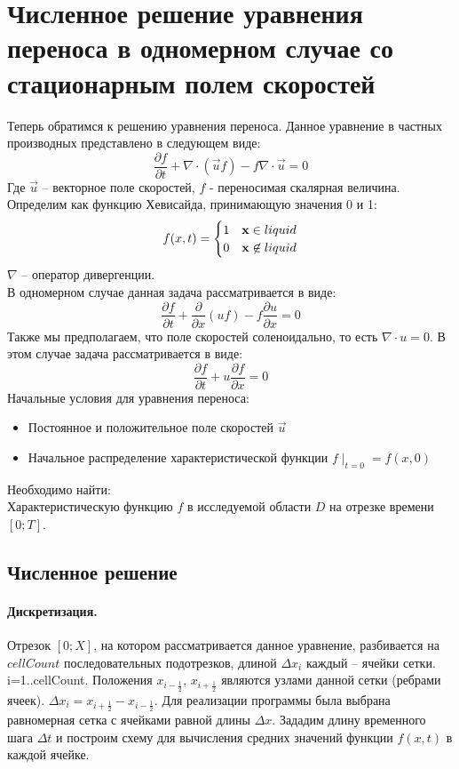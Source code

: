 \documentclass[12pt,a4paper]{article}
\begin{document}
\section{Численное решение уравнения переноса в одномерном случае со стационарным полем скоростей}
Теперь обратимся к решению уравнения переноса.
Данное уравнение в частных производных представлено в следующем виде:
\[
\frac{\partial f}{\partial t}+\nabla\cdot(\overrightarrow{u}f)-f\nabla\cdot\overrightarrow{u}=0
\]
Где $\overrightarrow{u}$ – векторное поле скоростей, $f$ - переносимая скалярная величина. Определим  как функцию Хевисайда, принимающую значения 0 и 1:
\begin{equation}
f(x,t)=\begin{cases}1 & {\bf x}\in liquid \\0 & {\bf x}\not\in liquid\end{cases}
\end{equation}
$\nabla$ – оператор дивергенции.\\
В одномерном случае данная задача рассматривается в виде:
\[
\frac{\partial f}{\partial t}+\frac{\partial }{\partial x}(uf)-f\frac{\partial u}{\partial x}=0
\]
Также мы предполагаем, что поле скоростей  соленоидально, то есть $\nabla\cdot u=0$. В этом случае задача рассматривается в виде:
\[
\frac{\partial f}{\partial t}+u\frac{\partial f}{\partial x}=0
\]
Начальные условия для уравнения переноса:
\begin{itemize}
	\item {Постоянное и положительное поле скоростей $\overrightarrow{u}$}
	\item Начальное распределение характеристической функции $f\mid_{t=0}=f(x,0)$
\end{itemize}
Необходимо найти:\\
Характеристическую функцию $f$ в исследуемой области $D$ на отрезке времени $[0; T]$.

\subsection{Численное решение}

\paragraph{Дискретизация.}
Отрезок $[0;X]$, на котором рассматривается данное уравнение, разбивается на $cellCount$ последовательных подотрезков, длиной $\Delta x_i$ каждый – ячейки сетки. i=1..cellCount. Положения $x_{i-\frac{1}{2}}$, $x_{i+\frac{1}{2}}$ являются узлами данной сетки (ребрами ячеек). $\Delta x_i=x_{i+\frac{1}{2}}-x_{i-\frac{1}{2}}$. Для реализации программы была выбрана равномерная сетка с ячейками равной длины $\Delta x$. Зададим длину временного шага $\Delta t$ и построим схему для вычисления средних значений функции $f(x,t)$ в каждой ячейке.\\
\end{document}
